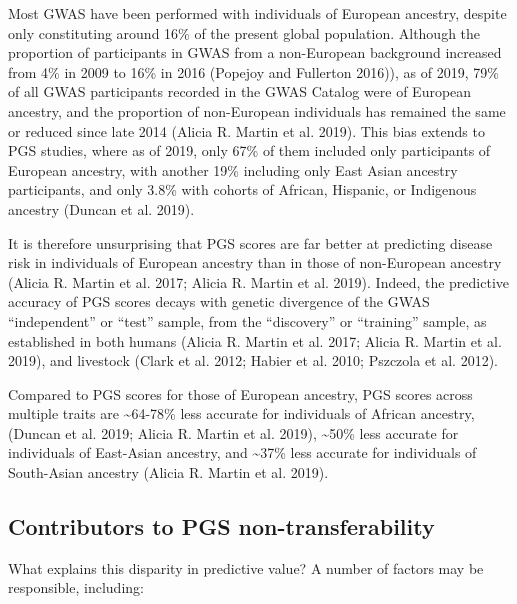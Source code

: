 \documentclass[
]{book}
\begin{document}
Most GWAS have been performed with individuals of European ancestry, despite only constituting around 16\% of the present global population. Although the proportion of participants in GWAS from a non-European background increased from 4\% in 2009 to 16\% in 2016 (Popejoy and Fullerton 2016)), as of 2019, 79\% of all GWAS participants recorded in the GWAS Catalog were of European ancestry, and the proportion of non-European individuals has remained the same or reduced since late 2014 (Alicia R. Martin et al. 2019). This bias extends to PGS studies, where as of 2019, only 67\% of them included only participants of European ancestry, with another 19\% including only East Asian ancestry participants, and only 3.8\% with cohorts of African, Hispanic, or Indigenous ancestry (Duncan et al. 2019).

It is therefore unsurprising that PGS scores are far better at predicting disease risk in individuals of European ancestry than in those of non-European ancestry (Alicia R. Martin et al. 2017; Alicia R. Martin et al. 2019). Indeed, the predictive accuracy of PGS scores decays with genetic divergence of the GWAS ``independent'' or ``test'' sample, from the ``discovery'' or ``training'' sample, as established in both humans (Alicia R. Martin et al. 2017; Alicia R. Martin et al. 2019), and livestock (Clark et al. 2012; Habier et al. 2010; Pszczola et al. 2012).

Compared to PGS scores for those of European ancestry, PGS scores across multiple traits are \textasciitilde64-78\% less accurate for individuals of African ancestry, (Duncan et al. 2019; Alicia R. Martin et al. 2019), \textasciitilde50\% less accurate for individuals of East-Asian ancestry, and \textasciitilde37\% less accurate for individuals of South-Asian ancestry (Alicia R. Martin et al. 2019).

\hypertarget{contributors-to-pgs-non-transferability}{%
\subsection{Contributors to PGS non-transferability}\label{contributors-to-pgs-non-transferability}}

What explains this disparity in predictive value? A number of factors may be responsible, including:
\end{document}
